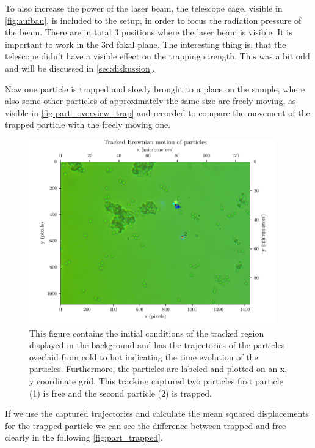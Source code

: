 \documentclass[12pt,english]{scrartcl}
\begin{document}
To also increase the power of the laser beam, the telescope cage, visible in
\autoref{fig:aufbau}, is included to the setup, in order to focus the radiation
pressure of the beam. There are in total 3 positions where
the laser beam is visible. It is important to work in the 3rd fokal plane.
The interesting thing is, that the telescope didn't have
a visible effect on the trapping strength. This was a bit odd and will be
discussed in \autoref{sec:diskussion}.

Now one particle is trapped and slowly brought to a place on the sample, where
also some other particles of approximately the same size are freely moving, as
visible in \autoref{fig:part_overview_trap} and recorded to compare the
movement of the trapped particle with the freely moving one.

\begin{figure}[H]
	\centering
	\includegraphics[width=0.95\textwidth]{figures/III_tracked.pdf}
	\caption[Capture of trapped particle]{This figure contains the initial conditions of the
		tracked region displayed in the background and has the trajectories of the
		particles overlaid from cold to hot indicating the time evolution of the
		particles. Furthermore, the particles are labeled and plotted on an x, y
		coordinate grid. This tracking captured two particles first particle (1) is
		free and the second particle (2) is trapped.
	}\label{fig:part_overview_trap}
\end{figure}

If we use the captured trajectories and calculate the mean squared
displacements for the trapped particle we can see the difference between
trapped and free clearly in the following \autoref{fig:part_trapped}.
\end{document}
